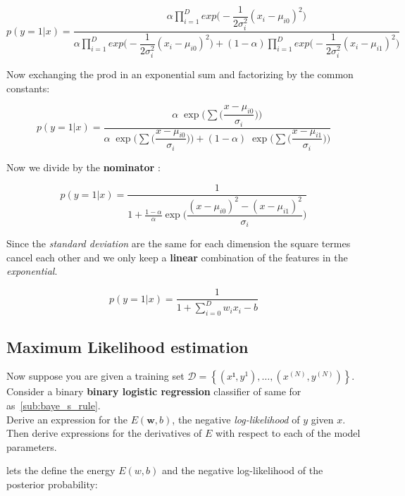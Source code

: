 \documentclass[a4paper]{tufte-handout}
\begin{document}
\begin{equation}
  p(y=1|x) = \dfrac{ \alpha \prod_{i=1}^D
  exp\big(-\dfrac{1}{2\sigma_i^2}(x_i-\mu_{i0})^2 \big)}
  {\alpha \prod_{i=1}^D
  exp\big(-\dfrac{1}{2\sigma_i^2}(x_i-\mu_{i0})^2 \big)+
  (1-\alpha)\prod_{i=1}^D
  exp\big(-\dfrac{1}{2\sigma_i^2}(x_i-\mu_{i1})^2 \big)}
\end{equation}

Now exchanging the prod in an exponential sum and factorizing by the common
constants:

\begin{equation}
  p(y=1|x) = \dfrac{\alpha \;\exp\Big(
    \sum\big(\dfrac{x-\mu_{i0}}{\sigma_{i}}\big) \Big)}{
  \alpha \;\exp\Big(
    \sum\big(\dfrac{x-\mu_{i0}}{\sigma_{i}}\big) \Big)
  +
  (1-\alpha) \;\exp\Big(
    \sum\big(\dfrac{x-\mu_{i1}}{\sigma_{i}}\big) \Big)
  } 
\end{equation}


Now we divide by the \textbf{nominator} :

\begin{equation}
  p(y=1|x) = \dfrac{1}{1+\frac{1-\alpha}{\alpha} \exp\big(
  \dfrac{(x-\mu_{i0})^2-(x-\mu_{i1})^2}{\sigma_i}\big) }
\end{equation}


Since the \emph{standard deviation} are the same for each dimension the square
termes cancel each other and we only keep a \textbf{linear} combination of the
features in the \emph{exponential}.


\begin{equation}
  p(y=1|x) = \dfrac{1}{1+ \sum_{i=0}^D w_i x_i-b}
\end{equation}


\subsection{Maximum Likelihood estimation}%
\label{sub:maximum_likelihood}

Now suppose you are given a training set $\mathcal{D} = \left\{ (x¹,y^1),\ldots,
(x^(N),y^(N))\right\}$. Consider a binary \textbf{binary logistic regression}
classifier of same for as~\ref{sub:baye_s_rule}.\\

Derive an expression for the $E(\mathbf{w},b)$, the negative
\emph{log-likelihood} of $y$ given $x$. Then derive expressions for the
derivatives of $E$ with respect to each of the model parameters.


lets the define the energy $E(w,b)$ and the negative log-likelihood of the
posterior probability:
\end{document}
